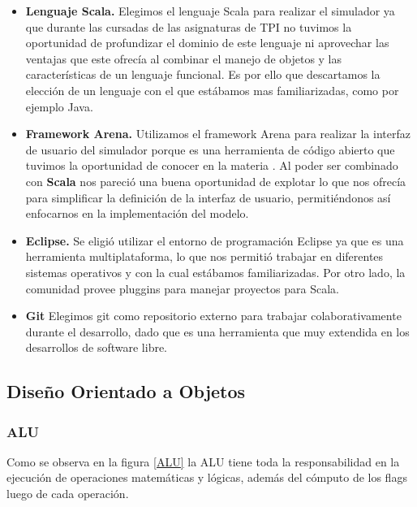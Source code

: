 \begin{itemize}


\item  \textbf{Lenguaje Scala.}
Elegimos el lenguaje Scala para realizar el simulador ya que durante las cursadas de las asignaturas de TPI no tuvimos la oportunidad de profundizar el dominio de este lenguaje ni aprovechar las ventajas que este ofrecía al combinar el manejo de objetos y las características de un lenguaje funcional. Es por ello que descartamos la elección de un lenguaje con el que estábamos mas familiarizadas, como por ejemplo Java.

\item  \textbf{Framework Arena.}
Utilizamos el framework Arena para realizar la interfaz de usuario del simulador porque es una herramienta de código abierto que tuvimos la oportunidad de conocer en la materia \ui. Al poder ser combinado con \textbf{Scala} nos pareció una buena oportunidad de explotar lo que nos ofrecía para simplificar la definición de la interfaz de usuario, permitiéndonos así enfocarnos en la implementación del modelo. 

\item  \textbf{Eclipse.}
Se eligió utilizar el entorno de programación Eclipse ya que es una herramienta multiplataforma, lo que nos permitió trabajar en diferentes sistemas operativos y con la cual estábamos familiarizadas.  Por otro lado, la comunidad provee pluggins para manejar proyectos para Scala.

\item  \textbf{Git}
Elegimos git como repositorio externo para trabajar colaborativamente durante el desarrollo, dado que es una herramienta que muy extendida en los desarrollos de software libre.

\end{itemize}

\subsection{Diseño Orientado a Objetos}

\subsubsection{ALU}
Como se observa en la figura \ref{ALU} la ALU tiene toda la responsabilidad en la ejecución de operaciones matemáticas y lógicas, además del cómputo de los flags luego de cada operación. 

